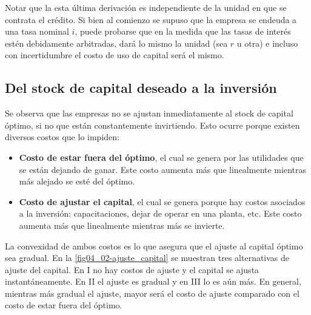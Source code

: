 \documentclass[DeGregorioResumen]{subfiles}
\begin{document}
Notar que la esta última derivación es independiente de la unidad en que se contrata el crédito. Si bien al comienzo se supuso que la empresa se endeuda a una tasa nominal $i$, puede probarse que en la medida que las tasas de interés estén debidamente arbitradas, dará lo mismo la unidad (sea $r$ u otra) e incluso con incertidumbre el costo de uso de capital será el mismo.

\subsection{Del stock de capital deseado a la inversión}

Se observa que las empresas no se ajustan inmediatamente al stock de capital óptimo, si no que están constantemente invirtiendo. Esto ocurre porque existen diversos costos que lo impiden:

\begin{itemize}
  \item \textbf{Costo de estar fuera del óptimo}, el cual se genera por las utilidades que se están dejando de ganar. Este costo aumenta más que linealmente mientras más alejado se esté del óptimo.
  \item \textbf{Costo de ajustar el capital}, el cual se genera porque hay costos asociados a la inversión: capacitaciones, dejar de operar en una planta, etc. Este costo aumenta más que linealmente mientras más se invierte.
\end{itemize}

La convexidad de ambos costos es lo que asegura que el ajuste al capital óptimo sea gradual. En la \autoref{fig04_02-ajuste_capital} se muestran tres alternativas de ajuste del capital. En I no hay costos de ajuste y el capital se ajusta instantáneamente. En II el ajuste es gradual y en III lo es aún más. En general, mientras más gradual el ajuste, mayor será el costo de ajuste comparado con el costo de estar fuera del óptimo.


\end{document}
